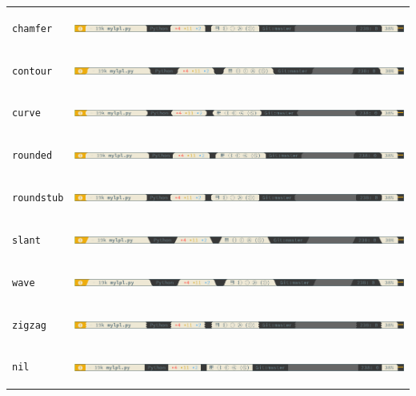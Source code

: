 \documentclass[11pt]{article}
\begin{document}
\begin{enumerate}
\begin{center}
\begin{tabular}{ll}
\texttt{chamfer} & \begin{center}
\includegraphics[width=.9\linewidth]{img/powerline-chamfer.png}
\end{center}\\
\texttt{contour} & \begin{center}
\includegraphics[width=.9\linewidth]{img/powerline-contour.png}
\end{center}\\
\texttt{curve} & \begin{center}
\includegraphics[width=.9\linewidth]{img/powerline-curve.png}
\end{center}\\
\texttt{rounded} & \begin{center}
\includegraphics[width=.9\linewidth]{img/powerline-rounded.png}
\end{center}\\
\texttt{roundstub} & \begin{center}
\includegraphics[width=.9\linewidth]{img/powerline-roundstub.png}
\end{center}\\
\texttt{slant} & \begin{center}
\includegraphics[width=.9\linewidth]{img/powerline-slant.png}
\end{center}\\
\texttt{wave} & \begin{center}
\includegraphics[width=.9\linewidth]{img/powerline-wave.png}
\end{center}\\
\texttt{zigzag} & \begin{center}
\includegraphics[width=.9\linewidth]{img/powerline-zigzag.png}
\end{center}\\
\texttt{nil} & \begin{center}
\includegraphics[width=.9\linewidth]{img/powerline-nil.png}
\end{center}\\
\end{tabular}
\end{center}


\end{enumerate}
\end{document}
